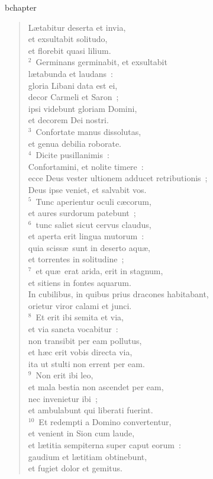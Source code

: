 bchapter\begin{verse}\vspace{-19pt}L\ae tabitur deserta et invia,\\ et exsultabit solitudo,\\ et florebit quasi lilium.\\
${}^{2}$~Germinans germinabit, et exsultabit\\ l\ae tabunda et laudans~:\\ gloria Libani data est ei,\\ decor Carmeli et Saron~;\\ ipsi videbunt gloriam Domini,\\ et decorem Dei nostri.\\
${}^{3}$~Confortate manus dissolutas,\\ et genua debilia roborate.\\
${}^{4}$~Dicite pusillanimis~:\\ Confortamini, et nolite timere~:\\ ecce Deus vester ultionem adducet retributionis~;\\ Deus ipse veniet, et salvabit vos.\\
${}^{5}$~Tunc aperientur oculi c\ae corum,\\ et aures surdorum patebunt~;\\
${}^{6}$~tunc saliet sicut cervus claudus,\\ et aperta erit lingua mutorum~:\\ quia sciss\ae\ sunt in deserto aqu\ae ,\\ et torrentes in solitudine~;\\
${}^{7}$~et qu\ae\ erat arida, erit in stagnum,\\ et sitiens in fontes aquarum.\\ In cubilibus, in quibus prius dracones habitabant,\\ orietur viror calami et junci.\\
${}^{8}$~Et erit ibi semita et via,\\ et via sancta vocabitur~:\\ non transibit per eam pollutus,\\ et h\ae c erit vobis directa via,\\ ita ut stulti non errent per eam.\\
${}^{9}$~Non erit ibi leo,\\ et mala bestia non ascendet per eam,\\ nec invenietur ibi~;\\ et ambulabunt qui liberati fuerint.\\
${}^{10}$~Et redempti a Domino convertentur,\\ et venient in Sion cum laude,\\ et l\ae titia sempiterna super caput eorum~:\\ gaudium et l\ae titiam obtinebunt,\\ et fugiet dolor et gemitus.\end{verse}



